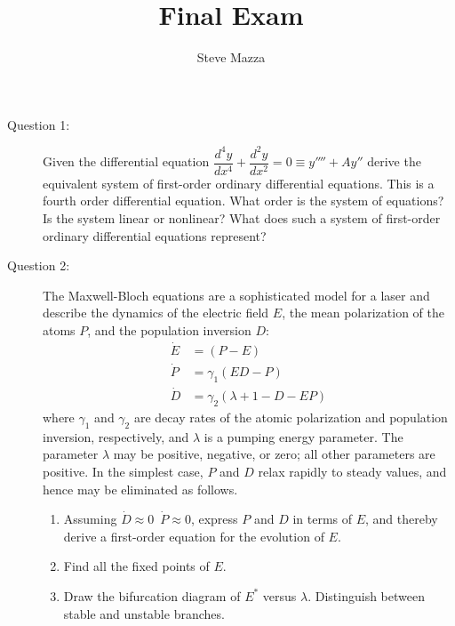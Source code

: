 \documentclass[letterpaper,10pt]{article}
\title{Final Exam}
\author{Steve Mazza}
\begin{document}
\maketitle

\begin{description}
\item[Question 1:]
Given the differential equation $\dfrac{d^4y}{dx^4}+\dfrac{d^2y}{dx^2}=0\equiv y''''+Ay''$ derive the equivalent system of first-order ordinary differential equations.  This is a fourth order differential equation.  What order is the system of equations?  Is the system linear or nonlinear?  What does such a system of first-order ordinary differential equations represent?


\item[Question 2:]
The Maxwell-Bloch equations are a sophisticated model for a laser and describe the dynamics of the electric field $E$, the mean polarization of the atoms $P$, and the population inversion $D$:
\begin{align*}
\dot{E} &= (P-E) \\
\dot{P} &= \gamma_1(ED-P) \\
\dot{D} &= \gamma_2(\lambda+1-D-EP)
\end{align*}
where $\gamma_1$ and $\gamma_2$ are decay rates of the atomic polarization and population inversion, respectively, and $\lambda$ is a pumping energy parameter.  The parameter $\lambda$ may be positive, negative, or zero; all other parameters are positive.  In the simplest case, $P$ and $D$ relax rapidly to steady values, and hence may be eliminated as follows.
\begin{enumerate}
\item Assuming $\dot{D}\approx 0$\ $\dot{P}\approx 0$, express $P$ and $D$ in terms of $E$, and thereby derive a first-order equation for the evolution of $E$.
\item Find all the fixed points of $E$.
\item Draw the bifurcation diagram of $E^*$ versus $\lambda$.  Distinguish between stable and unstable branches.
\end{enumerate}



\end{description}
\end{document}
